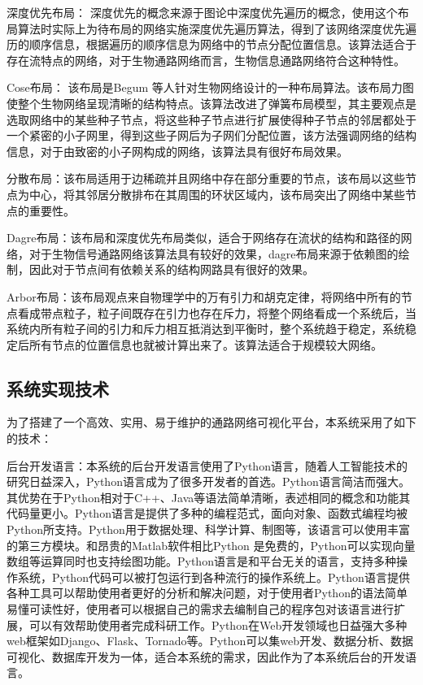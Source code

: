 深度优先布局： 深度优先的概念来源于图论中深度优先遍历的概念，使用这个布局算法时实际上为待布局的网络实施深度优先遍历算法，得到了该网络深度优先遍历的顺序信息，根据遍历的顺序信息为网络中的节点分配位置信息。该算法适合于存在流特点的网络，对于生物通路网络而言，生物信息通路网络符合这种特性。

Cose布局： 该布局是Begum\cite{An algorithm for automated layout of process description maps drawn in SBGN} 等人针对生物网络设计的一种布局算法。该布局力图使整个生物网络呈现清晰的结构特点。该算法改进了弹簧布局\cite{Spring layout}模型，其主要观点是选取网络中的某些种子节点，将这些种子节点进行扩展使得种子节点的邻居都处于一个紧密的小子网里，得到这些子网后为子网们分配位置，该方法强调网络的结构信息，对于由致密的小子网构成的网络，该算法具有很好布局效果。

分散布局：该布局适用于边稀疏并且网络中存在部分重要的节点，该布局以这些节点为中心，将其邻居分散排布在其周围的环状区域内，该布局突出了网络中某些节点的重要性。

Dagre布局：该布局和深度优先布局类似，适合于网络存在流状的结构和路径的网络，对于生物信号通路网络该算法具有较好的效果，dagre布局来源于依赖图的绘制，因此对于节点间有依赖关系的结构网路具有很好的效果。

Arbor布局：该布局观点来自物理学中的万有引力和胡克定律，将网络中所有的节点看成带点粒子，粒子间既存在引力也存在斥力，将整个网络看成一个系统后，当系统内所有粒子间的引力和斥力相互抵消达到平衡时，整个系统趋于稳定，系统稳定后所有节点的位置信息也就被计算出来了。该算法适合于规模较大网络。

\subsection{系统实现技术}
为了搭建了一个高效、实用、易于维护的通路网络可视化平台，本系统采用了如下的技术：

后台开发语言：本系统的后台开发语言使用了Python语言，随着人工智能技术的研究日益深入，Python语言成为了很多开发者的首选。Python语言简洁而强大。其优势在于Python相对于C++、Java等语法简单清晰，表述相同的概念和功能其代码量更小。Python语言是提供了多种的编程范式，面向对象、函数式编程均被Python所支持。Python用于数据处理、科学计算、制图等，该语言可以使用丰富的第三方模块。和昂贵的Matlab软件相比Python 是免费的，Python可以实现向量数组等运算同时也支持绘图功能。Python语言是和平台无关的语言，支持多种操作系统，Python代码可以被打包运行到各种流行的操作系统上。Python语言提供各种工具可以帮助使用者更好的分析和解决问题，对于使用者Python的语法简单易懂可读性好，使用者可以根据自己的需求去编制自己的程序包对该语言进行扩展，可以有效帮助使用者完成科研工作。Python在Web开发领域也日益强大多种web框架如Django、Flask、Tornado等。Python可以集web开发、数据分析、数据可视化、数据库开发为一体，适合本系统的需求，因此作为了本系统后台的开发语言。

